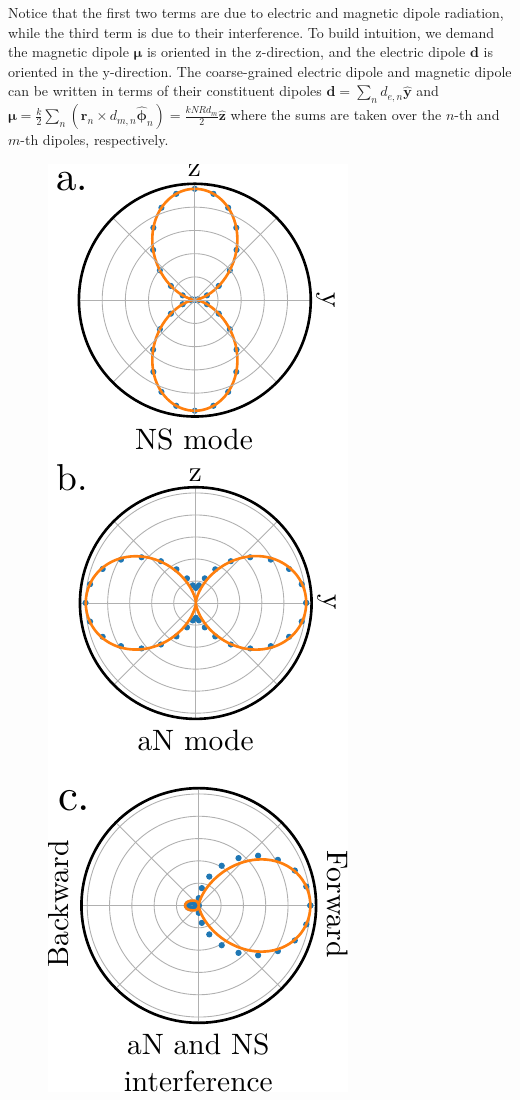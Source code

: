 \documentclass[journal=apchd5,manuscript=article]{achemso}
\begin{document}
\noindent Notice that the first two terms are due to electric and magnetic dipole radiation, while the third term is due to their interference. To build intuition, we demand the magnetic dipole $\boldsymbol{\mu}$ is oriented in the z-direction, and the electric dipole $\textbf{d}$ is oriented in the y-direction. The coarse-grained electric dipole and magnetic dipole can be written in terms of their constituent dipoles $\textbf{d} = \sum_n d_{e,n} \hat{\textbf{y}}$ and $\boldsymbol{\mu} = \frac{k}{2}\sum_n(\textbf{r}_n \times d_{m,n} \hat{\boldsymbol{\phi}}_n) = \frac{kNRd_m}{2}\hat{\textbf{z}}$ where the sums are taken over the $n$-th and $m$-th dipoles, respectively.

\begin{figure}
\includegraphics{differential_power_diagrams.pdf}

\end{figure}
\end{document}

